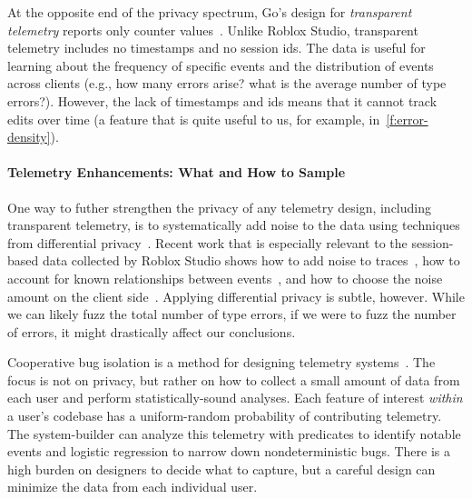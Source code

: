 \documentclass[english,submission,cleveref]{programming}
\begin{document}
At the opposite end of the privacy spectrum, Go's design for \emph{transparent
telemetry} reports only counter values~\cite{transparent-telemetry}.
Unlike Roblox Studio, transparent telemetry includes no timestamps and no 
session ids.
The data is useful for learning about the frequency of specific events and the
distribution of events across clients (e.g., how many 
errors arise? what is the average number of type errors?).
However, the lack of timestamps and ids means that it cannot track edits
over time (a feature that is quite useful to us, for example, in~\cref{f:error-density}).


\paragraph{Telemetry Enhancements: What and How to Sample}

One way to futher strengthen the privacy of any telemetry design, including
transparent telemetry, is to systematically add noise to the data using
techniques from differential
privacy~\cite{zhlbr-cc-2020,epk-ccs-2014,wblj-usenix-2017}.
Recent work that is especially relevant to the session-based data collected
by Roblox Studio shows how to add noise to traces~\cite{zhlbr-cc-2020},
how to account for known relationships between events~\cite{zhlbr-oopsla-2020},
and how to choose the noise amount on the client side~\cite{hlzbr-ecoop-2021}.
Applying differential privacy is subtle, however.
While we can likely fuzz the total number of type errors, if we were to
fuzz the number of  errors, it might drastically
affect our conclusions.

Cooperative bug isolation is a method for designing
telemetry systems~\cite{liblit-thesis}.
The focus is not on privacy, but rather on how to collect a small amount of
data from each user and perform statistically-sound analyses.
Each feature of interest \emph{within} a user's codebase has a uniform-random
probability of contributing telemetry.
The system-builder can analyze this telemetry with predicates to identify
notable events and logistic regression to narrow down nondeterministic bugs.
There is a high burden on designers to decide what to capture,
but a careful design can minimize the data from each individual user.
\end{document}
